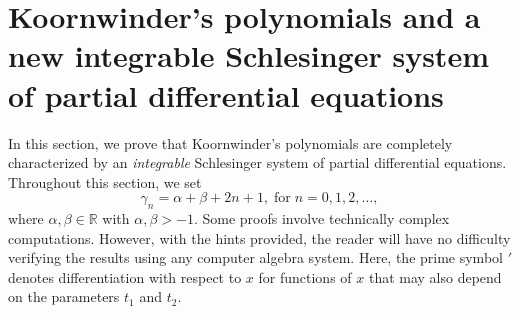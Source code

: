 \documentclass[10pt, reqno]{amsart}
\numberwithin{equation}{section}
\numberwithin{equation}{section}
\begin{document}
\section{Koornwinder's polynomials and a new integrable Schlesinger system of partial differential equations}
In this section, we prove that Koornwinder's polynomials \cite{Ko} are completely characterized by an \emph{integrable} Schlesinger system of partial differential equations. Throughout this section, we set
\begin{equation}
\gamma_n=\alpha+\beta+2n+1,\;\mbox{for}\; n=0,1,2,\ldots, \label{Kga}
\end{equation}
where $\alpha, \beta \in \mathbb{R}$ with $\alpha, \beta>-1$. Some proofs involve technically complex computations. However, with the hints provided, the reader will have no difficulty verifying the results using any computer algebra system. Here, the prime symbol $'$ denotes differentiation with respect to $x$ for functions of $x$ that may also depend on the parameters $t_1$ and $t_2$.
\end{document}

